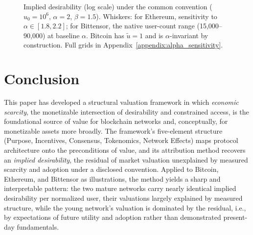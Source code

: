 \documentclass[12pt]{article}
\begin{document}
\begin{figure}[H]
\centering
{}
\caption{Implied desirability (log scale) under the common convention (\( u_0 = 10^6 \), \( \alpha = 2 \), \( \beta = 1.5 \)). Whiskers: for Ethereum, sensitivity to \( \alpha \in [1.8, 2.2] \); for Bittensor, the native user-count range (15{,}000--90{,}000) at baseline \(\alpha\). Bitcoin has \( \tilde{u} = 1 \) and is \(\alpha\)-invariant by construction. Full grids in Appendix~\ref{appendix:alpha_sensitivity}.}
\label{fig:desirability_scores_sensitivity}
\end{figure}




\section{Conclusion}
This paper has developed a structural valuation framework in which \emph{economic scarcity}, the monetizable intersection of desirability and constrained access, is the foundational source of value for blockchain networks and, conceptually, for monetizable assets more broadly. The framework's five-element structure (Purpose, Incentives, Consensus, Tokenomics, Network Effects) maps protocol architecture onto the preconditions of value, and its attribution method recovers an \emph{implied desirability}, the residual of market valuation unexplained by measured scarcity and adoption under a disclosed convention. Applied to Bitcoin, Ethereum, and Bittensor as illustrations, the method yields a sharp and interpretable pattern: the two mature networks carry nearly identical implied desirability per normalized user, their valuations largely explained by measured structure, while the young network's valuation is dominated by the residual, i.e., by expectations of future utility and adoption rather than demonstrated present-day fundamentals.
\end{document}
